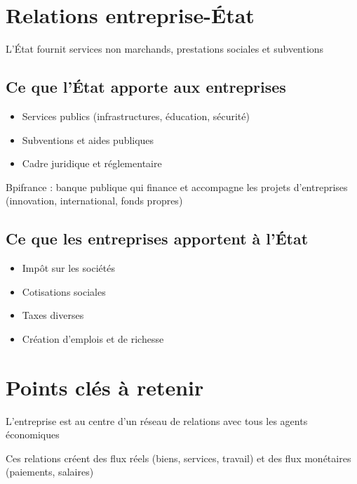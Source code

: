 \documentclass[12pt,a4paper]{article}
\begin{document}
\section{Relations entreprise-État}

\begin{tcolorbox}[title=\textbf{POINT CLÉ}]
L'État fournit services non marchands, prestations sociales et subventions
\end{tcolorbox}

\subsection{Ce que l'État apporte aux entreprises}
\begin{itemize}
    \item Services publics (infrastructures, éducation, sécurité)
    \item Subventions et aides publiques
    \item Cadre juridique et réglementaire
\end{itemize}

\begin{tcolorbox}[title=\textbf{EXEMPLE}]
Bpifrance : banque publique qui finance et accompagne les projets d'entreprises (innovation, international, fonds propres)
\end{tcolorbox}

\subsection{Ce que les entreprises apportent à l'État}
\begin{itemize}
    \item Impôt sur les sociétés
    \item Cotisations sociales
    \item Taxes diverses
    \item Création d'emplois et de richesse
\end{itemize}

\section{Points clés à retenir}

\begin{tcolorbox}[title=\textbf{POINT CLÉ}]
L'entreprise est au centre d'un réseau de relations avec tous les agents économiques
\end{tcolorbox}

\begin{tcolorbox}[title=\textbf{POINT CLÉ}]
Ces relations créent des flux réels (biens, services, travail) et des flux monétaires (paiements, salaires)
\end{tcolorbox}
\end{document}
